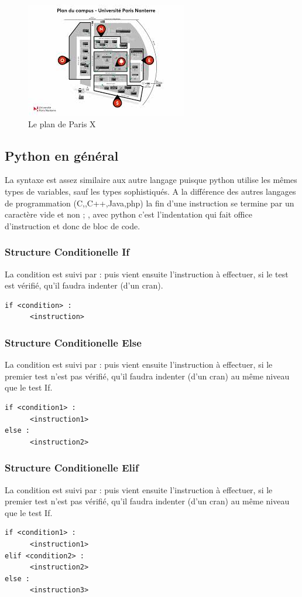 \documentclass[a4paper, 12pt, twoside]{article}
\begin{document}
{{{\begin{center}
\begin{figure}[h!]
\centering
\includegraphics[scale=1.3]{plan.jpeg}
\caption{Le plan de Paris X}
\end{figure}
\end{center}
\subsection{Python en général}
La syntaxe est assez similaire aux autre langage puisque python utilise les mêmes types de variables, sauf les types sophistiqués. A la différence des autres langages de programmation (C,,C++,Java,php) la fin d'une instruction se termine par un caractère vide
et non  ; , avec python c'est l'indentation qui fait office d'instruction et donc de bloc de code.
\subsubsection{ Structure Conditionelle If }
La condition est suivi par  :  puis vient ensuite l'instruction à effectuer, si le test est vérifié, qu'il faudra indenter (d'un cran).
\begin{verbatim}
if <condition> :
      <instruction>
\end{verbatim}
\subsubsection{ Structure Conditionelle Else}
La condition est suivi par  :  puis vient ensuite l'instruction à effectuer, si le premier test n'est pas vérifié, qu'il faudra indenter (d'un cran) au même niveau que le test If.
\begin{verbatim}
if <condition1> :
      <instruction1>
else :
      <instruction2>
\end{verbatim}
\subsubsection{ Structure Conditionelle Elif }
La condition est suivi par  :  puis vient ensuite l'instruction à effectuer, si le premier test n'est pas vérifié, qu'il faudra indenter (d'un cran) au même niveau que le test If.
\begin{verbatim}
if <condition1> :
      <instruction1>
elif <condition2> :
      <instruction2>
else : 
      <instruction3>
\end{verbatim}
}}}
\end{document}

